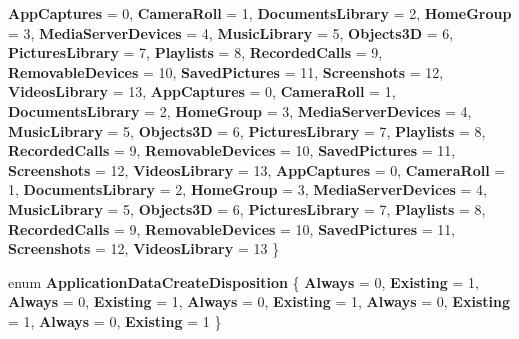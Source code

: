 \begin{DoxyCompactItemize}
{\bfseries App\+Captures} = 0, 
{\bfseries Camera\+Roll} = 1, 
{\bfseries Documents\+Library} = 2, 
{\bfseries Home\+Group} = 3, 
\newline
{\bfseries Media\+Server\+Devices} = 4, 
{\bfseries Music\+Library} = 5, 
{\bfseries Objects3D} = 6, 
{\bfseries Pictures\+Library} = 7, 
\newline
{\bfseries Playlists} = 8, 
{\bfseries Recorded\+Calls} = 9, 
{\bfseries Removable\+Devices} = 10, 
{\bfseries Saved\+Pictures} = 11, 
\newline
{\bfseries Screenshots} = 12, 
{\bfseries Videos\+Library} = 13, 
{\bfseries App\+Captures} = 0, 
{\bfseries Camera\+Roll} = 1, 
\newline
{\bfseries Documents\+Library} = 2, 
{\bfseries Home\+Group} = 3, 
{\bfseries Media\+Server\+Devices} = 4, 
{\bfseries Music\+Library} = 5, 
\newline
{\bfseries Objects3D} = 6, 
{\bfseries Pictures\+Library} = 7, 
{\bfseries Playlists} = 8, 
{\bfseries Recorded\+Calls} = 9, 
\newline
{\bfseries Removable\+Devices} = 10, 
{\bfseries Saved\+Pictures} = 11, 
{\bfseries Screenshots} = 12, 
{\bfseries Videos\+Library} = 13, 
\newline
{\bfseries App\+Captures} = 0, 
{\bfseries Camera\+Roll} = 1, 
{\bfseries Documents\+Library} = 2, 
{\bfseries Home\+Group} = 3, 
\newline
{\bfseries Media\+Server\+Devices} = 4, 
{\bfseries Music\+Library} = 5, 
{\bfseries Objects3D} = 6, 
{\bfseries Pictures\+Library} = 7, 
\newline
{\bfseries Playlists} = 8, 
{\bfseries Recorded\+Calls} = 9, 
{\bfseries Removable\+Devices} = 10, 
{\bfseries Saved\+Pictures} = 11, 
\newline
{\bfseries Screenshots} = 12, 
{\bfseries Videos\+Library} = 13
 \}
\item 
\mbox{\label{namespace_windows_1_1_storage_ad31753d0e1a55938e5b849af2661f220}} 
enum {\bfseries Application\+Data\+Create\+Disposition} \{ \newline
{\bfseries Always} = 0, 
{\bfseries Existing} = 1, 
{\bfseries Always} = 0, 
{\bfseries Existing} = 1, 
\newline
{\bfseries Always} = 0, 
{\bfseries Existing} = 1, 
{\bfseries Always} = 0, 
{\bfseries Existing} = 1, 
\newline
{\bfseries Always} = 0, 
{\bfseries Existing} = 1
 \}
\item 

\end{DoxyCompactItemize}
